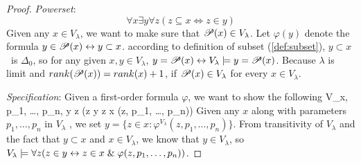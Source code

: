 \begin{proof}
\item \emph{Powerset}:
\begin{equation}
\forall x \exists y \forall z (z \subseteq x \iff z \in y)
\end{equation}
Given any $x \in V_\lambda$, we want to make sure that $\mathscr{P} (x) \in V_\lambda$. Let $\varphi(y)$ denote the formula $y \in \mathscr{P} (x) \leftrightarrow y \subset x$.
according to definition of subset (\ref{def:subset}), $y \subset x$ is $\Delta_0$, so for any given $x, y \in V_\lambda$, $y = \mathscr{P} (x) \leftrightarrow V_\lambda \models y = \mathscr{P} (x)$.
Because $\lambda$ is limit and $rank(\mathscr{P} (x)) = rank(x)+1$, if $\mathscr{P} (x) \in V_\lambda$ for every $x \in V_\lambda$.

\item \emph{Specification}:%
Given a first-order formula $\varphi$, we want to show the following
\beq
V_\lambda \models \forall x, p_1, \ldots, p_n, \exists y \forall z (z \in y \iff z \in x \et \varphi(z, p_1, \ldots, p_n))
\eeq
Given any $x$ along with parameters $p_1, \ldots, p_n$ in $V_\lambda$ , we set $y = \{z \in x : \varphi^{V_\lambda}(z, p_1, \ldots, p_n) \}$. From transitivity of $V_\lambda$ and the fact that $y \subset x$ and $x \in V_\lambda$, we know that $y \in V_\lambda$, so $V_\lambda \models \forall z (z \in y \leftrightarrow z \in x \mathrel{\&} \varphi(z, p_1, \dots, p_n))$.
\ece
\end{proof}






